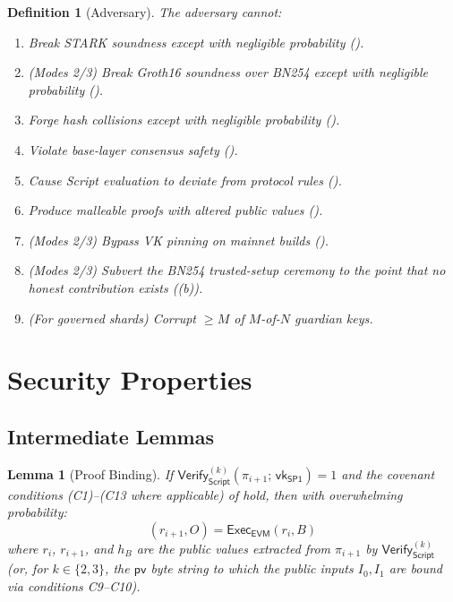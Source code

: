 \documentclass[11pt,a4paper]{article}
\newtheorem{definition}{Definition}[section]
\newtheorem{lemma}[theorem]{Lemma}
\newcommand{\Verify}{\mathsf{Verify}}
\newcommand{\Exec}{\mathsf{Exec}}
\newcommand{\SPone}{\mathsf{SP1}}
\newcommand{\EVM}{\mathsf{EVM}}
\newcommand{\vkSP}{\mathsf{vk}_{\SPone}}           %
\begin{document}
\begin{definition}[Adversary]
The adversary \emph{cannot}:
\begin{enumerate}[nosep,label=(N\arabic*)]
    \item Break STARK soundness except with negligible probability ().
    \item (Modes 2/3) Break Groth16 soundness over BN254 except with negligible probability ().
    \item Forge hash collisions except with negligible probability ().
    \item Violate base-layer consensus safety ().
    \item Cause Script evaluation to deviate from protocol rules ().
    \item Produce malleable proofs with altered public values ().
    \item (Modes 2/3) Bypass VK pinning on mainnet builds ().
    \item (Modes 2/3) Subvert the BN254 trusted-setup ceremony to the point that no honest contribution exists ((b)).
    \item (For governed shards) Corrupt $\geq M$ of $M$-of-$N$ guardian keys.
\end{enumerate}
\end{definition}

\section{Security Properties}\label{sec:properties}

\subsection{Intermediate Lemmas}

\begin{lemma}[Proof Binding]\label{lem:proof-bind}
If $\Verify_{\mathsf{Script}}^{(k)}(\pi_{i+1};\,\vkSP) = 1$ and the covenant conditions (C1)--(C13 where applicable) of  hold, then with overwhelming probability:
\[
    (r_{i+1}, O) = \Exec_{\EVM}(r_i, B)
\]
where $r_i$, $r_{i+1}$, and $h_B$ are the public values extracted from $\pi_{i+1}$ by $\Verify_{\mathsf{Script}}^{(k)}$ (or, for $k \in \{2, 3\}$, the $\mathsf{pv}$ byte string to which the public inputs $I_0, I_1$ are bound via conditions C9--C10).
\end{lemma}
\end{document}

